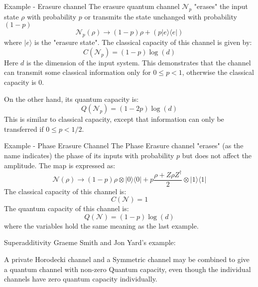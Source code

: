 \begin{frame}{Example - Erasure channel}
        The erasure quantum channel $\mathcal{N}_p$ "erases" the input state $\rho$
        with probability $p$ or transmits the state unchanged with probability $(1-p)$
        \begin{equation}
            \mathcal{N}_p(\rho) \rightarrow (1-p)\rho + (p| e \rangle\langle e |)
        \end{equation}
        where $|e\rangle$ is the "erasure state".
        The classical capacity of this channel is given by:
        \begin{equation}
            C(\mathcal{N}_p) = (1-p)\log (d)
        \end{equation}
        Here $d$ is the dimension of the input system. This demonstrates that the channel
        can transmit some classical information only for $0 \leq p < 1$, otherwise the
        classical capacity is $0$.
        
        On the other hand, its quantum capacity is:
        \begin{equation}
            Q(\mathcal{N}_p) = (1-2p)\log (d)
        \end{equation}
        This is similar to classical capacity, except that information can only be transferred
        if $0 \leq p < 1/2$.
\end{frame}
\begin{frame}{Example - Phase Erasure Channel}
        The Phase Erasure channel "erases" (as the name indicates) the phase of its inputs with
        probability $p$ but does not affect the amplitude. The map is expressed as:
        \begin{equation}
            \mathcal{N}(\rho) \rightarrow (1-p)\rho \otimes |0\rangle\langle 0| + p\frac{\rho + Z\rho Z^\dagger}{2}\otimes |1\rangle\langle 1|
        \end{equation}
        The classical capacity of this channel is:
        \begin{equation}
            C(\mathcal{N}) = 1
        \end{equation}
        The quantum capacity of this channel is:
        \begin{equation}
            Q(\mathcal{N}) = (1-p)\log (d)
        \end{equation}
        where the variables hold the same meaning as the last example.
\end{frame}

\begin{frame}{Superadditivity}
    Graeme Smith and Jon Yard's example:

    A private Horodecki channel and a Symmetric channel may be combined to
    give a quantum channel with non-zero Quantum capacity, even though the
    individual channels have zero quantum capacity individually.
\end{frame}